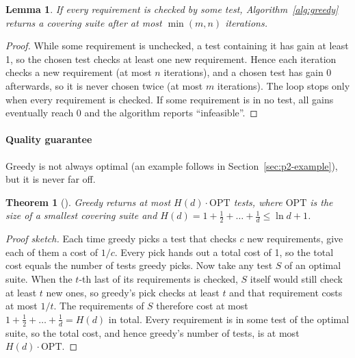 \documentclass[conference]{IEEEtran}
\newtheorem{theorem}{Theorem}
\newtheorem{lemma}{Lemma}
\theoremstyle{definition}
\theoremstyle{remark}
\begin{document}
\begin{lemma}\label{lem:greedy-valid}
If every requirement is checked by some test, Algorithm~\ref{alg:greedy}
returns a covering suite after at most $\min(m, n)$ iterations.
\end{lemma}
\begin{proof}
While some requirement is unchecked, a test containing it has gain at least
1, so the chosen test checks at least one new requirement. Hence each
iteration checks a new requirement (at most $n$ iterations), and a chosen test
has gain 0 afterwards, so it is never chosen twice (at most $m$ iterations).
The loop stops only when every requirement is checked. If some requirement is
in no test, all gains eventually reach 0 and the algorithm reports
``infeasible''.
\end{proof}

\paragraph*{Quality guarantee}
Greedy is not always optimal (an example follows in
Section~\ref{sec:p2-example}), but it is never far off.

\begin{theorem}[\cite{chvatal1979}]\label{thm:approx}
Greedy returns at most $H(d)\cdot\mathrm{OPT}$ tests, where $\mathrm{OPT}$ is
the size of a smallest covering suite and
$H(d) = 1 + \tfrac12 + \dots + \tfrac1d \le \ln d + 1$.
\end{theorem}
\begin{proof}[Proof sketch]
Each time greedy picks a test that checks $c$ new requirements, give each of
them a cost of $1/c$. Every pick hands out a total cost of 1, so the total
cost equals the number of tests greedy picks. Now take any test $S$ of an
optimal suite. When the $t$-th last of its requirements is checked, $S$
itself would still check at least $t$ new ones, so greedy's pick checks at
least $t$ and that requirement costs at most $1/t$. The requirements of $S$
therefore cost at most $1 + \tfrac12 + \dots + \tfrac1d = H(d)$ in total.
Every requirement is in some test of the optimal suite, so the total cost,
and hence greedy's number of tests, is at most $H(d)\cdot\mathrm{OPT}$.
\end{proof}
\end{document}
